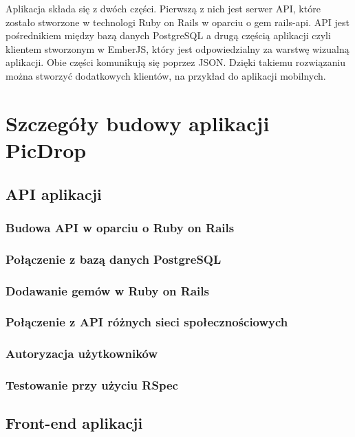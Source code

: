 \documentclass[brudnopis]{xmgr}
\begin{document}
Aplikacja składa się z dwóch części. Pierwszą z nich jest serwer API, które zostało stworzone w technologi Ruby on Rails w oparciu o gem rails-api. API jest pośrednikiem między bazą danych PostgreSQL a drugą częścią aplikacji czyli klientem stworzonym w EmberJS, który jest odpowiedzialny za warstwę wizualną aplikacji. Obie części komunikują się poprzez  JSON. Dzięki takiemu rozwiązaniu można stworzyć dodatkowych klientów, na przykład do aplikacji mobilnych.
 

\chapter{Szczegóły budowy aplikacji PicDrop}
\section{API aplikacji}
\subsection{Budowa API w oparciu o Ruby on Rails}
\subsection{Połączenie z bazą danych PostgreSQL}
\subsection{Dodawanie gemów w Ruby on Rails}
\subsection{Połączenie z API różnych sieci społecznościowych}
\subsection{Autoryzacja użytkowników}
\subsection{Testowanie przy użyciu RSpec}
\section{Front-end aplikacji}
\end{document}
